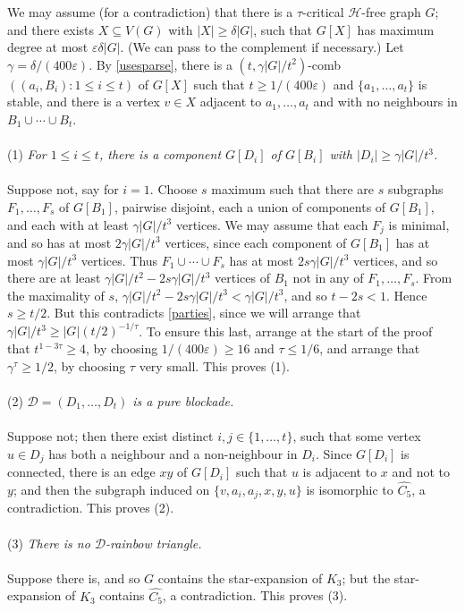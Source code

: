 \documentclass[titlepage,11pt]{article}
\def\ll{,\ldots,}
\def\cupcup{\cup\cdots\cup}
\newcommand{\vare}{\varepsilon}
\begin{document}
We may assume (for a contradiction) that there is a $\tau$-critical $\mathcal{H}$-free graph $G$;
and there exists $X\subseteq V(G)$
with $|X|\ge \delta|G|$, such that $G[X]$ has maximum degree at most $\vare\delta|G|$. (We can pass to the complement if necessary.)
Let $\gamma=\delta/(400\vare)$.
By \ref{usesparse}, 
there is
a $(t,\gamma|G|/t^2)$-comb $((a_i,B_i):1\le i\le t)$ of $G[X]$ such that $t\ge 1/(400\vare)$ and $\{a_1\ll a_t\}$ is stable, and
there is a vertex $v\in X$ adjacent to $a_1\ll a_t$ and with
no neighbours in $B_1\cupcup B_t$.
\\
\\
(1) {\em For $1\le i\le t$, there is a component $G[D_i]$ of $G[B_i]$ with $|D_i|\ge \gamma|G|/t^3$.}
\\
\\
Suppose not, say for $i = 1$. 
Choose $s$ maximum such that there are $s$ subgraphs $F_1\ll F_s$
of $G[B_1]$, pairwise disjoint, each a union of components of $G[B_1]$, and each with at least $\gamma|G|/t^3$ vertices. We may assume 
that each $F_j$ is minimal,
and so has at most $2\gamma|G|/t^3$ vertices, since each component of $G[B_1]$ has at most $\gamma|G|/t^3$ vertices. Thus
$F_1\cupcup F_s$ has at most $2s\gamma|G|/t^3$ vertices, and so there are at least $\gamma|G|/t^2-2s\gamma|G|/t^3$ vertices of $B_1$
not in any of $F_1\ll F_s$. From the maximality of $s$, $\gamma|G|/t^2-2s\gamma|G|/t^3<\gamma|G|/t^3$, and so
$t-2s<1$. Hence $s\ge t/2$. But this contradicts \ref{parties}, since
we will arrange that $\gamma|G|/t^3\ge |G|(t/2)^{-1/\tau}$. To ensure this last, arrange at the start of the proof that 
$t^{1-3\tau}\ge 4$, by choosing $1/(400\vare)\ge 16$ and $\tau\le  1/6$, and arrange that $\gamma^\tau\ge 1/2$, by
choosing $\tau$ very small. This proves (1).
\\
\\
(2) {\em $\mathcal{D}=(D_1\ll D_t)$ is a pure blockade.}
\\
\\
Suppose not; then there exist distinct $i,j\in \{1\ll t\}$, such that some vertex $u\in D_j$ has both a neighbour and a 
non-neighbour in $D_i$.
Since $G[D_i]$ is connected, there is an edge $xy$ of $G[D_i]$ such that $u$ is adjacent 
to $x$ and not to $y$; and then the subgraph induced on $\{v,a_i, a_j, x,y,u\}$ is isomorphic to $\widehat{C_5}$, a contradiction. 
This proves (2).
\\
\\
(3) {\em There is no $\mathcal{D}$-rainbow triangle.}
\\
\\
Suppose there is, 
and so $G$ contains the star-expansion of $K_3$; but the star-expansion of $K_3$
contains $\widehat{C_5}$, a contradiction. This proves (3).
\end{document}

